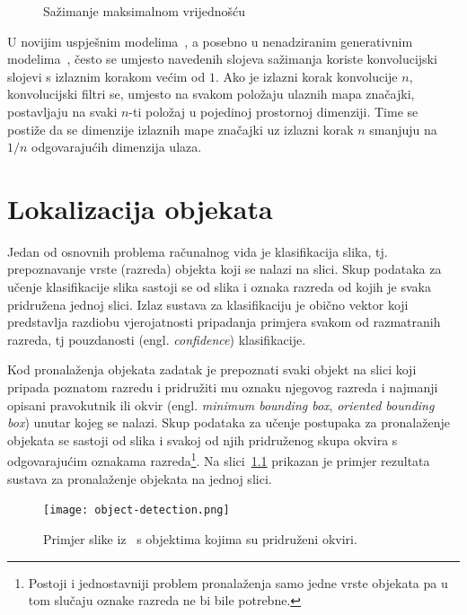 \documentclass[utf8, seminar, numeric, lmodern]{feri}
\newcommand{\ilustracija}[1]{}
\begin{document}
\begin{figure}[htbp] \centering
	\ilustracija{max_pool}
	\caption{Sažimanje maksimalnom vrijednošću}
	\label{fig:max_pool}
\end{figure}

U novijim uspješnim modelima~\cite{resnet}, a posebno u nenadziranim generativnim modelima~\cite{gan}, često se umjesto navedenih slojeva sažimanja koriste konvolucijski slojevi s izlaznim korakom većim od $1$. Ako je izlazni korak konvolucije $n$, konvolucijski filtri se, umjesto na svakom položaju ulaznih mapa značajki, postavljaju na svaki $n$-ti položaj u pojedinoj prostornoj dimenziji. Time se postiže da se dimenzije izlaznih mape značajki uz izlazni korak $n$ smanjuju na $1/n$ odgovarajućih dimenzija ulaza.



\chapter{Lokalizacija objekata} \label{chap:detekcija}

Jedan od osnovnih problema računalnog vida je klasifikacija slika, tj. prepoznavanje vrste (razreda) objekta koji se nalazi na slici. Skup podataka za učenje klasifikacije slika sastoji se od slika i oznaka razreda od kojih je svaka pridružena jednoj slici. Izlaz sustava za klasifikaciju je obično vektor koji predstavlja razdiobu vjerojatnosti pripadanja primjera svakom od razmatranih razreda, tj pouzdanosti (engl. \emph{confidence}) klasifikacije.

Kod pronalaženja objekata zadatak je prepoznati svaki objekt na slici koji pripada poznatom razredu i pridružiti mu oznaku njegovog razreda i najmanji opisani pravokutnik ili okvir (engl. \emph{minimum bounding box}, \emph{oriented bounding box}) unutar kojeg se nalazi. Skup podataka za učenje postupaka za pronalaženje objekata se sastoji od slika i svakoj od njih pridruženog skupa okvira s odgovarajućim oznakama razreda\footnote{Postoji i jednostavniji problem pronalaženja samo jedne vrste objekata pa u tom slučaju oznake razreda ne bi bile potrebne.}. Na slici~\ref{fig:det-obj} prikazan je primjer rezultata sustava za pronalaženje objekata na jednoj slici.

\begin{figure}[htbp] \centering
	\texttt{[image: object-detection.png]}
	\caption{Primjer slike iz~\cite{yolo2web} s objektima kojima su pridruženi okviri.}
	\label{fig:det-obj}
\end{figure}
\end{document}
